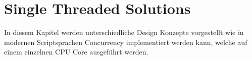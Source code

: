 \section{Single Threaded Solutions}
\label{section: Single Threaded Solutions}

In diesem Kapitel werden unterschiedliche Design Konzepte vorgestellt wie in modernen Scriptsprachen Concurrency implementiert werden kann, welche auf einem einzelnen CPU Core ausgeführt werden.